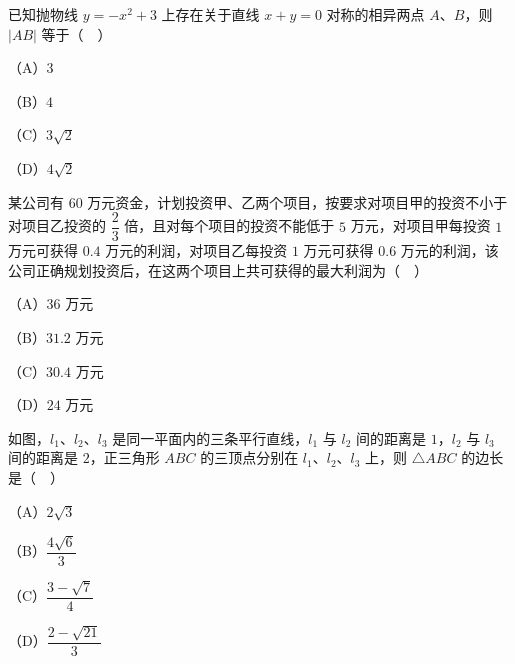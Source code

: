 \begin{question}
已知抛物线 $y=-x^2+3$ 上存在关于直线 $x+y=0$ 对称的相异两点 $A$、$B$，则 $|AB|$ 等于（　）

（A）$3$

（B）$4$

（C）$3\sqrt2$

（D）$4\sqrt2$

\end{question}
\begin{question}
某公司有 $60$ 万元资金，计划投资甲、乙两个项目，按要求对项目甲的投资不小于对项目乙投资的 $\dfrac23$ 倍，且对每个项目的投资不能低于 $5$ 万元，对项目甲每投资 $1$ 万元可获得 $0.4$ 万元的利润，对项目乙每投资 $1$ 万元可获得 $0.6$ 万元的利润，该公司正确规划投资后，在这两个项目上共可获得的最大利润为（　）

（A）$36$ 万元

（B）$31.2$ 万元

（C）$30.4$ 万元

（D）$24$ 万元

\Needspace{0.4\textheight}
\end{question}
\begin{question}
如图，$l_1$、$l_2$、$l_3$ 是同一平面内的三条平行直线，$l_1$ 与 $l_2$ 间的距离是 $1$，$l_2$ 与 $l_3$ 间的距离是 $2$，正三角形 $ABC$ 的三顶点分别在 $l_1$、$l_2$、$l_3$ 上，则 $\triangle ABC$ 的边长是（　）
\nopagebreak[4]
\begin{center}\end{center}
\nopagebreak[4]
（A）$2\sqrt3$

（B）$\dfrac{4\sqrt6}{3}$

（C）$\dfrac{3-\sqrt7}{4}$

（D）$\dfrac{2-\sqrt{21}}{3}$

\end{question}

